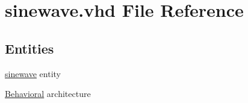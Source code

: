 \hypertarget{sinewave_8vhd}{}\section{sinewave.\+vhd File Reference}
\label{sinewave_8vhd}
\subsection*{Entities}
\begin{DoxyCompactItemize}
\item 
\hyperlink{classsinewave}{sinewave} entity
\item 
\hyperlink{classsinewave_1_1_behavioral}{Behavioral} architecture
\end{DoxyCompactItemize}
